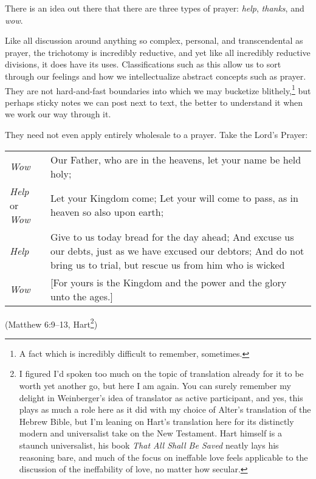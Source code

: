 There is an idea out there that there are three types of prayer: \emph{help}, \emph{thanks}, and \emph{wow}. \parencite{helpthankswow}

Like all discussion around anything so complex, personal, and transcendental as prayer, the trichotomy is incredibly reductive, and yet like all incredibly reductive divisions, it does have its uses. Classifications such as this allow us to sort through our feelings and how we intellectualize abstract concepts such as prayer. They are not hard-and-fast boundaries into which we may bucketize blithely,\footnote{A fact which is incredibly difficult to remember, sometimes.} but perhaps sticky notes we can post next to text, the better to understand it when we work our way through it.

They need not even apply entirely wholesale to a prayer. Take the Lord's Prayer:

\newlength{\tRemainder}
\noindent\begin{tabular}{@{}>{\raggedleft\arraybackslash}p{}|p{\tRemainder}}
\emph{Wow} &
Our Father, who are in the heavens, let your name be held holy; \\
\emph{Help} or \emph{Wow} &
Let your Kingdom come; Let your will come to pass, as in heaven so also upon earth; \\
\emph{Help} &
Give to us today bread for the day ahead; And excuse us our debts, just as we have excused our debtors; And do not bring us to trial, but rescue us from him who is wicked \\
\emph{Wow} &
{[}For yours is the Kingdom and the power and the glory unto the ages.{]}
\end{tabular}

\noindent(Matthew 6:9--13, Hart\nocite{dbh-nt}\footnote{I figured I'd spoken too much on the topic of translation already for it to be worth yet another go, but here I am again. You can surely remember my delight in Weinberger's idea of translator as active participant, and yes, this plays as much a role here as it did with my choice of Alter's translation of the Hebrew Bible, but I'm leaning on Hart's translation here for its distinctly modern and universalist take on the New Testament. Hart himself is a staunch universalist, his book \emph{That All Shall Be Saved} neatly lays his reasoning bare, and much of the focus on ineffable love feels applicable to the discussion of the ineffability of love, no matter how secular.})

